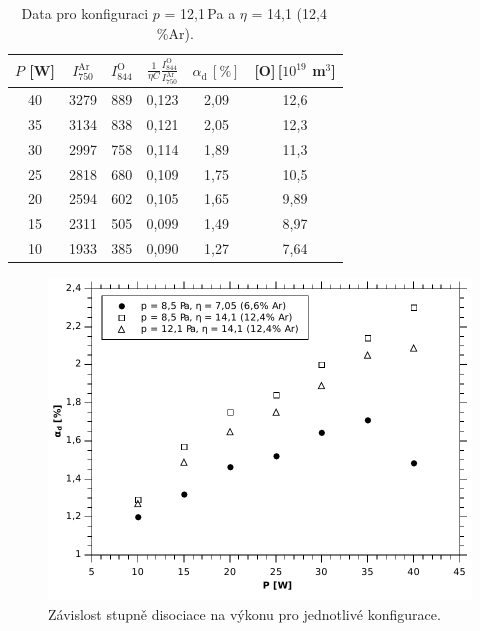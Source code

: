 \documentclass[12pt]{article}
\begin{document}
\begin{table}[htbp]
\begin{center}
\begin{tabular}{|c|c|c|c|c|c|}
\hline
$P$ [W] & $I_{750}^\mathrm{Ar}$ & $I_{844}^\mathrm{O}$ & $\frac{1}{\eta C}\frac{I_{844}^\mathrm{O}}{I_{750}^\mathrm{Ar}}$ & $\alpha_\mathrm{d}\,[\%]$ & [O]\,[$10^{19}$ m$^3$] \\ \hline
40 & 3279 & 889 & 0,123 & 2,09 & 12,6 \\ \hline
35 & 3134 & 838 & 0,121 & 2,05 & 12,3 \\ \hline
30 & 2997 & 758 & 0,114 & 1,89 & 11,3 \\ \hline
25 & 2818 & 680 & 0,109 & 1,75 & 10,5 \\ \hline
20 & 2594 & 602 & 0,105 & 1,65 & 9,89 \\ \hline
15 & 2311 & 505 & 0,099 & 1,49 & 8,97 \\ \hline
10 & 1933 & 385 & 0,090 & 1,27 & 7,64 \\ \hline
\end{tabular}
\end{center}
\caption{Data pro konfiguraci $p$ = 12,1\,Pa a $\eta$ = 14,1 (12,4\,\%Ar).}
\label{k3}
\end{table}



\begin{figure}[htbp]
\begin{center}
\includegraphics[width=12cm]{ionization.pdf}
\caption{Závislost stupně disociace na výkonu pro jednotlivé konfigurace.}
\label{ioni}
\end{center}
\end{figure}
\end{document}
